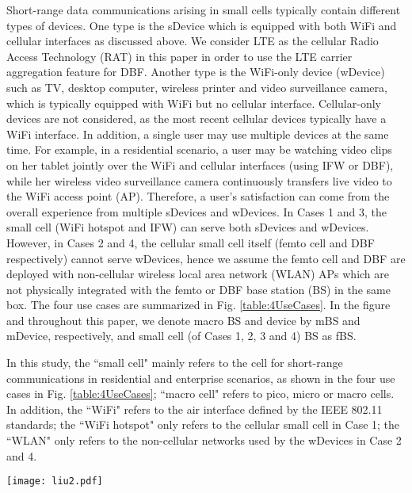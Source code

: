 \documentclass[journal,final,letterpaper,10pt,doublecolumn,twoside]{IEEEtran}
\begin{document}
Short-range data communications arising in small cells typically contain different types of devices. One type is the sDevice which is equipped with both WiFi and cellular interfaces as discussed above. We consider LTE as the cellular Radio Access Technology (RAT) in this paper in order to use the LTE carrier aggregation feature for DBF. Another type is the WiFi-only device (wDevice) such as TV, desktop computer, wireless printer and video surveillance camera, which is typically equipped with WiFi but no cellular interface. Cellular-only devices are not considered, as the most recent cellular devices typically have a WiFi interface.
In addition, a single user may use multiple devices at the same time. For example, in a residential scenario, a user may be watching video clips on her tablet jointly over the WiFi and cellular interfaces (using IFW or DBF),  while her wireless video surveillance camera continuously transfers live video to the WiFi access point (AP). Therefore, a user's satisfaction can come from the overall experience from multiple sDevices and wDevices. In Cases 1 and 3, the small cell (WiFi hotspot and IFW) can serve both sDevices and wDevices. However, in Cases 2 and 4, the cellular small cell itself (femto cell and DBF respectively) cannot serve wDevices, hence we assume the femto cell and DBF are deployed with non-cellular wireless local area network (WLAN) APs which are not physically integrated with the femto or DBF base station (BS) in the same box. The four use cases are summarized in Fig. \ref{table:4UseCases}. In the figure and throughout this paper, we denote macro BS and device by mBS and mDevice, respectively, and small cell (of Cases 1, 2, 3 and 4) BS as fBS.



In this study, the ``small cell" mainly refers to the cell for short-range communications in residential and enterprise scenarios, as shown in the four use cases in Fig. \ref{table:4UseCases}; ``macro cell" refers to pico, micro or macro cells. In addition, the ``WiFi" refers to the air interface defined by the IEEE 802.11 standards; the ``WiFi hotspot" only refers to the cellular small cell in Case 1; the ``WLAN" only refers to the non-cellular networks used by the wDevices in  Case 2 and 4.


\begin{figure*}
  \center
  \texttt{[image: liu2.pdf]}
  \caption{Four use cases considered in this paper. Cases 1 and 2 are the baseline. Cases 3 and 4 are the focus of this paper. LTE and WiFi represent the air interfaces used in a band; blank box means the spectrum is  not used. Note that in Cases 2 and 4, the sDevice can select either the cellular small cell or the non-cellular WLAN; for simplicity, we assume it always selects the cellular small cell.} \label{table:4UseCases}
\end{figure*}
\end{document}
